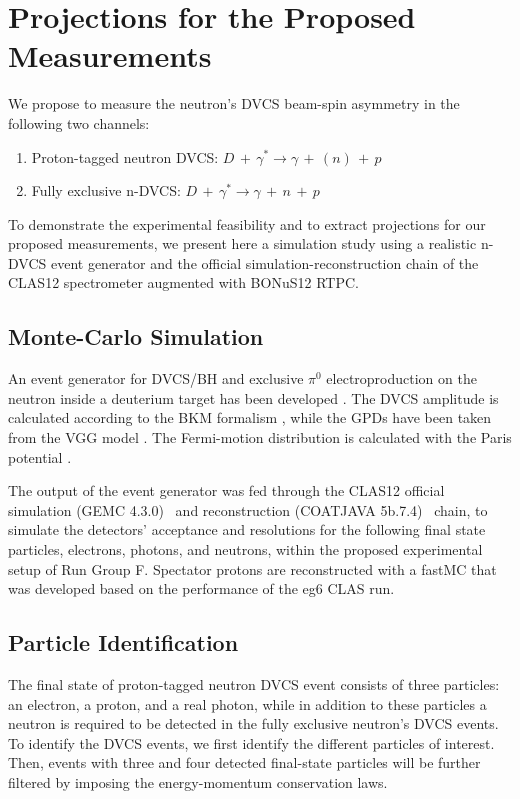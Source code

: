 \chapter{Projections for the Proposed Measurements}
\label{chap:reach}
We propose to measure the neutron's DVCS beam-spin asymmetry in the following 
two channels:
\begin{enumerate}
   \item Proton-tagged neutron DVCS: $D\,+\,\gamma^{*}  \longrightarrow 
      \gamma\,+\,(n)\,+\,p$
   \item Fully exclusive n-DVCS: $D\,+\,\gamma^{*}  \longrightarrow \gamma\,+\, 
      n \,+\,p$
\end{enumerate}

To demonstrate the experimental feasibility and to extract projections for our 
proposed measurements, we present here a simulation study using a realistic 
n-DVCS event generator and the official simulation-reconstruction chain of the 
CLAS12 spectrometer augmented with BONuS12 RTPC. 


\section{Monte-Carlo Simulation}
An event generator for DVCS/BH and exclusive $\pi^0$ electroproduction on the 
neutron inside a deuterium target has been developed \cite{ahmed}. The DVCS 
amplitude is calculated according to the BKM formalism \cite{Belitsky:2001ns}, 
while the GPDs have been taken from the VGG model 
\cite{PhysRevD.60.094017,Guidal:2004nd}. The Fermi-motion distribution is 
calculated with the Paris potential \cite{PhysRevC.21.861}.

The output of the event generator was fed through the  CLAS12 official 
simulation (GEMC 4.3.0)~\cite{clas12-gemc} and reconstruction (COATJAVA 
5b.7.4)~\cite{clas12-coatjava} chain, to simulate the detectors' acceptance and 
resolutions for the following final state particles, electrons, photons, and 
neutrons, within the proposed experimental setup of Run Group F. Spectator 
protons are reconstructed with a fastMC that was developed based on the 
performance of the eg6 CLAS run.

\section{Particle Identification}

The final state of proton-tagged neutron DVCS event consists of three 
particles: an electron, a proton, and a real photon, while in addition to these 
particles a neutron is required to be detected in the fully exclusive neutron's 
DVCS events. To identify the DVCS events, we first identify the different 
particles of interest. Then, events with three and four detected final-state 
particles will be further filtered by imposing the energy-momentum conservation 
laws.

